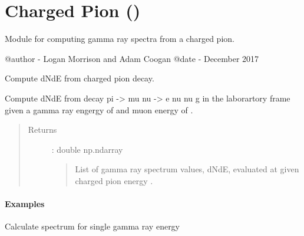 \documentclass[letterpaper,10pt,english]{sphinxmanual}
\begin{document}
\section{Charged Pion ()}
\label{\detokenize{modules:module-hazma.charged_pion}}\label{\detokenize{modules:charged-pion-hazma-charged-pion}}
Module for computing gamma ray spectra from a charged pion.

@author - Logan Morrison and Adam Coogan
@date - December 2017

\begin{fulllineitems}
\label{\detokenize{modules:hazma.charged_pion.decay_spectra}}
Compute dNdE from charged pion decay.

Compute dNdE from decay pi -\textgreater{} mu nu -\textgreater{} e nu nu g in the laborartory frame
given a gamma ray engergy of  and muon energy of .
\begin{quote}\begin{description}
\item[{Returns}] \leavevmode
{} : double np.ndarray
\begin{quote}

List of gamma ray spectrum values, dNdE, evaluated at  given
charged pion energy .
\end{quote}

\end{description}\end{quote}
\paragraph{Examples}

Calculate spectrum for single gamma ray energy

\begin{sphinxVerbatim}[commandchars=\\\{\}]
   
    
   
\end{sphinxVerbatim}


\end{fulllineitems}
\end{document}
